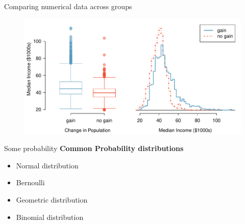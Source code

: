 \documentclass[12pt,a4paper]{beamer}
\begin{document}
\begin{frame}{Comparing numerical data across groups 
}
\begin{figure}
   \centering
   \includegraphics[width=\textwidth]{figures/countyIncomeSplitByPopGain/countyIncomeSplitByPopGain}
\end{figure}
\end{frame}
\begin{frame}{Some probability}
\textbf{Common Probability distributions}
\begin{itemize}
\item Normal distribution
\item Bernoulli
\item Geometric distribution
\item Binomial distribution
\end{itemize}
\end{frame}
\end{document}
